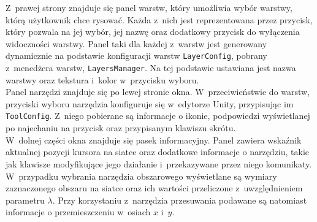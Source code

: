 Z~prawej strony znajduje się panel warstw, który umożliwia wybór warstwy, którą użytkownik chce rysować.
Każda z~nich jest reprezentowana przez przycisk, który pozwala na jej wybór,
jej nazwę oraz dodatkowy przycisk do wyłączenia widoczności warstwy.
Panel taki dla każdej z~warstw jest generowany dynamicznie na podstawie konfiguracji warstw \texttt{LayerConfig},
pobrany z~menedżera warstw, \texttt{LayersManager}.
Na tej podstawie ustawiana jest nazwa warstwy oraz tekstura i~kolor w~przycisku wyboru.\\
\indent Panel narzędzi znajduje się po lewej stronie okna.
W~przeciwieństwie do warstw, przyciski wyboru narzędzia konfiguruje się w~edytorze Unity,
przypisując im \texttt{ToolConfig}.
Z~niego pobierane są informacje o ikonie,
podpowiedzi wyświetlanej po najechaniu na przycisk oraz przypisanym klawiszu skrótu.\\
\indent W~dolnej części okna znajduje się pasek informacyjny.
Panel zawiera wskaźnik aktualnej pozycji kursora na siatce oraz dodatkowe informacje o narzędziu,
takie jak klawisze modyfikujące jego działanie i~przekazywane przez niego komunikaty.
W~przypadku wybrania narzędzia obszarowego wyświetlane są wymiary zaznaczonego obszaru na siatce
oraz ich wartości przeliczone z~uwzględnieniem parametru $\lambda$.
Przy korzystaniu z~narzędzia przesuwania podawane są natomiast informacje o przemieszczeniu w~osiach $x$ i~$y$.

